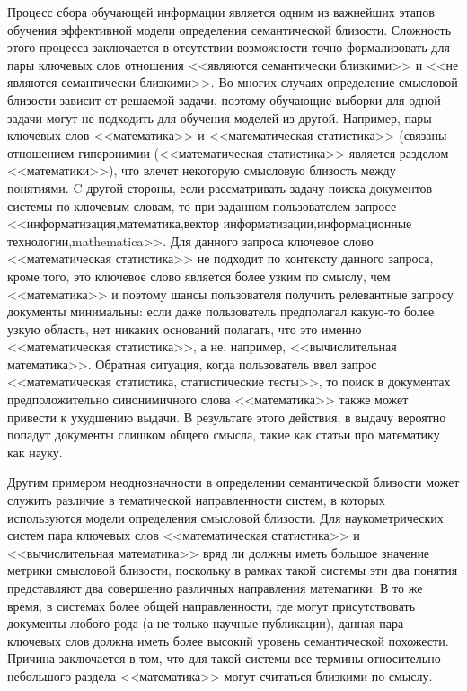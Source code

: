 Процесс сбора обучающей информации является одним из важнейших этапов обучения эффективной модели определения семантической близости. Сложность этого процесса заключается в отсутствии возможности точно формализовать для пары ключевых слов отношения <<являются семантически близкими>> и <<не являются семантически близкими>>. Во многих случаях определение смысловой близости зависит от решаемой задачи, поэтому обучающие выборки для одной задачи могут не подходить для обучения моделей из другой. Например, пары ключевых слов <<математика>> и <<математическая статистика>> (связаны отношением гиперонимии (<<математическая статистика>> является разделом <<математики>>), что влечет некоторую смысловую близость между понятиями. C другой стороны, если рассматривать задачу поиска документов системы по ключевым словам, то при заданном пользователем запросе <<информатизация,математика,вектор информатизации,информационные технологии,mathematica>>.  Для данного запроса ключевое слово <<математическая статистика>> не подходит по контексту данного запроса, кроме того, это ключевое слово является более узким по смыслу, чем <<математика>> и поэтому шансы пользователя получить релевантные запросу документы минимальны: если даже пользователь предполагал какую-то более узкую область, нет никаких оснований полагать, что это именно <<математическая статистика>>, а не, например, <<вычислительная математика>>. Обратная ситуация, когда пользователь ввел запрос <<математическая статистика, статистические тесты>>, то поиск в документах предположительно синонимичного слова <<математика>> также может привести к ухудшению выдачи. В результате этого действия, в выдачу вероятно попадут документы слишком общего смысла, такие как статьи про математику как науку.

Другим примером неоднозначности в определении семантической близости может служить различие в тематической направленности систем, в которых используются модели определения смысловой близости. Для наукометрических систем пара ключевых слов <<математическая статистика>> и <<вычислительная математика>> вряд ли должны иметь большое значение метрики смысловой близости, поскольку в рамках такой системы эти два понятия представляют два совершенно различных направления математики. В то же время, в системах более общей направленности, где могут присутствовать документы любого рода (а не только научные публикации), данная пара ключевых слов должна иметь более высокий уровень семантической похожести. Причина заключается в том, что для такой системы все термины относительно небольшого раздела <<математика>> могут считаться близкими по смыслу.

